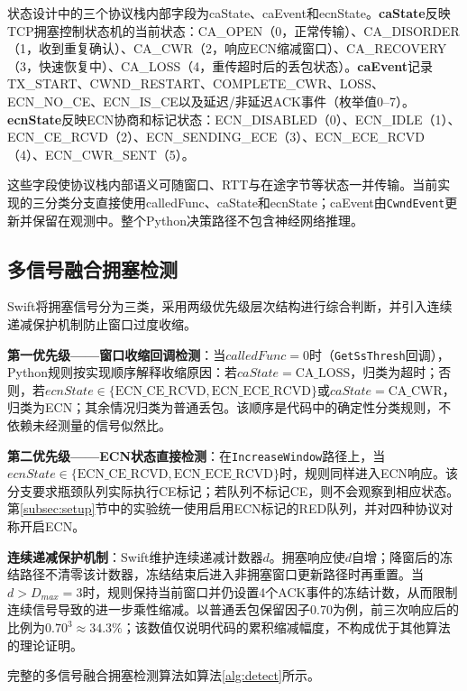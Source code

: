 \documentclass[10pt,twocolumn]{article}
\begin{document}
状态设计中的三个协议栈内部字段为caState、caEvent和ecnState。\textbf{caState}反映TCP拥塞控制状态机的当前状态：CA\_OPEN（0，正常传输）、CA\_DISORDER（1，收到重复确认）、CA\_CWR（2，响应ECN缩减窗口）、CA\_RECOVERY（3，快速恢复中）、CA\_LOSS（4，重传超时后的丢包状态）。\textbf{caEvent}记录TX\_START、CWND\_RESTART、COMPLETE\_CWR、LOSS、ECN\_NO\_CE、ECN\_IS\_CE以及延迟/非延迟ACK事件（枚举值0--7）。\textbf{ecnState}反映ECN协商和标记状态：ECN\_DISABLED（0）、ECN\_IDLE（1）、ECN\_CE\_RCVD（2）、ECN\_SENDING\_ECE（3）、ECN\_ECE\_RCVD（4）、ECN\_CWR\_SENT（5）。

这些字段使协议栈内部语义可随窗口、RTT与在途字节等状态一并传输。当前实现的三分类分支直接使用calledFunc、caState和ecnState；caEvent由\texttt{CwndEvent}更新并保留在观测中。整个Python决策路径不包含神经网络推理。

\subsection{多信号融合拥塞检测}

Swift将拥塞信号分为三类，采用两级优先级层次结构进行综合判断，并引入连续递减保护机制防止窗口过度收缩。

\textbf{第一优先级——窗口收缩回调检测}：当$calledFunc = 0$时（\texttt{GetSsThresh}回调），Python规则按实现顺序解释收缩原因：若$caState = \text{CA\_LOSS}$，归类为超时；否则，若$ecnState \in \{\text{ECN\_CE\_RCVD}, \text{ECN\_ECE\_RCVD}\}$或$caState = \text{CA\_CWR}$，归类为ECN；其余情况归类为普通丢包。该顺序是代码中的确定性分类规则，不依赖未经测量的信号似然比。

\textbf{第二优先级——ECN状态直接检测}：在\texttt{IncreaseWindow}路径上，当$ecnState \in \{\text{ECN\_CE\_RCVD}, \text{ECN\_ECE\_RCVD}\}$时，规则同样进入ECN响应。该分支要求瓶颈队列实际执行CE标记；若队列不标记CE，则不会观察到相应状态。第\ref{subsec:setup}节中的实验统一使用启用ECN标记的RED队列，并对四种协议对称开启ECN。

\textbf{连续递减保护机制}：Swift维护连续递减计数器$d$。拥塞响应使$d$自增；降窗后的冻结路径不清零该计数器，冻结结束后进入非拥塞窗口更新路径时再重置。当$d>D_{max}=3$时，规则保持当前窗口并仍设置4个ACK事件的冻结计数，从而限制连续信号导致的进一步乘性缩减。以普通丢包保留因子0.70为例，前三次响应后的比例为$0.70^3\approx34.3\%$；该数值仅说明代码的累积缩减幅度，不构成优于其他算法的理论证明。

完整的多信号融合拥塞检测算法如算法\ref{alg:detect}所示。
\end{document}
